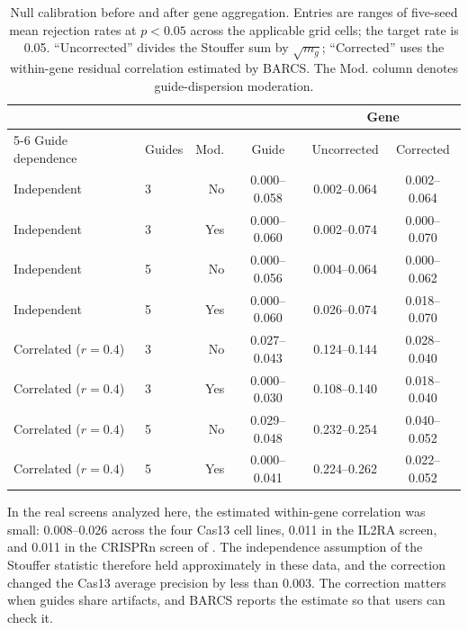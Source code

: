 \begin{table}[htbp]
\centering
\caption{Null calibration before and after gene aggregation.  Entries are
ranges of five-seed mean rejection rates at $p<0.05$ across the applicable
grid cells; the target rate is 0.05.  ``Uncorrected'' divides the Stouffer sum
by $\sqrt{m_g}$; ``Corrected'' uses the within-gene residual correlation
estimated by BARCS.  The Mod. column denotes guide-dispersion moderation.}
\label{tab:calibration-grid}
\small
\setlength{\tabcolsep}{3.5pt}
\begin{tabular}{llrccc}
\toprule
 & & & & \multicolumn{2}{c}{Gene}\\
\cmidrule(lr){5-6}
Guide dependence & Guides & Mod. & Guide & Uncorrected & Corrected\\
\midrule
Independent & 3 & No  & 0.000--0.058 & 0.002--0.064 & 0.002--0.064\\
Independent & 3 & Yes & 0.000--0.060 & 0.002--0.074 & 0.000--0.070\\
Independent & 5 & No  & 0.000--0.056 & 0.004--0.064 & 0.000--0.062\\
Independent & 5 & Yes & 0.000--0.060 & 0.026--0.074 & 0.018--0.070\\
Correlated ($r=0.4$) & 3 & No  & 0.027--0.043 & 0.124--0.144 & 0.028--0.040\\
Correlated ($r=0.4$) & 3 & Yes & 0.000--0.030 & 0.108--0.140 & 0.018--0.040\\
Correlated ($r=0.4$) & 5 & No  & 0.029--0.048 & 0.232--0.254 & 0.040--0.052\\
Correlated ($r=0.4$) & 5 & Yes & 0.000--0.041 & 0.224--0.262 & 0.022--0.052\\
\bottomrule
\end{tabular}
\end{table}

In the real screens analyzed here, the estimated within-gene correlation was
small: 0.008--0.026 across the four Cas13 cell lines, 0.011 in the IL2RA
screen, and 0.011 in the CRISPRn screen of \citet{evers2016crispr}.  The
independence assumption of the Stouffer statistic therefore held
approximately in these data, and the correction changed the Cas13 average
precision by less than 0.003.  The correction matters when guides share
artifacts, and BARCS reports the estimate so that users can check it.

